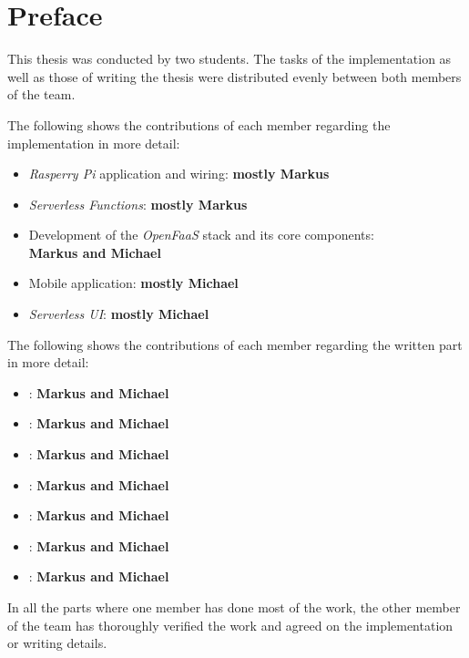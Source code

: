 \chapter*{Preface}

This thesis was conducted by two students. The tasks of the implementation as well as those of
writing the thesis were distributed evenly between both members of the team.

The following shows the contributions of each member regarding the implementation in more detail:

\begin{itemize}
  \setlength\itemsep{-1em}
  \item \textit{Rasperry Pi} application and wiring: \textbf{mostly Markus}
  \item \textit{Serverless Functions}: \textbf{mostly Markus}
  \item Development of the \textit{OpenFaaS} stack and its core components: \\ \textbf{Markus and Michael}
  \item Mobile application: \textbf{mostly Michael}
  \item \textit{Serverless UI}: \textbf{mostly Michael}
\end{itemize}

The following shows the contributions of each member regarding the written part in more detail:

\begin{itemize}
  \setlength\itemsep{-1em}
  \item {} : \textbf{Markus and Michael}
  \item {} : \textbf{Markus and Michael}
  \item {} : \textbf{Markus and Michael}
  \item {} : \textbf{Markus and Michael}
  \item {} : \textbf{Markus and Michael}
  \item {} : \textbf{Markus and Michael}
  \item {} : \textbf{Markus and Michael}
\end{itemize}

In all the parts where one member has done most of the work, the other member of the team has
thoroughly verified the work and agreed on the implementation or writing details.
